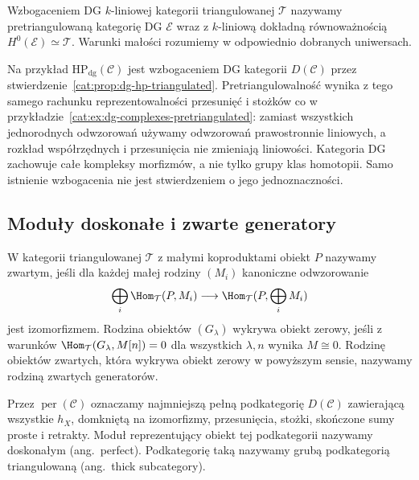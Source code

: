 \begin{definicja}\label{cat:def:dg-enhancement}
Wzbogaceniem DG $k$-liniowej kategorii triangulowanej $\mathcal T$ nazywamy pretriangulowaną kategorię DG $\mathcal E$ wraz z $k$-liniową dokładną równoważnością $H^0(\mathcal E)\simeq\mathcal T$. Warunki małości rozumiemy w odpowiednio dobranych uniwersach.
\end{definicja}

Na przykład $\mathrm{HP}_{\mathrm{dg}}(\mathcal C)$ jest wzbogaceniem DG kategorii $D(\mathcal C)$ przez stwierdzenie~\ref{cat:prop:dg-hp-triangulated}. Pretriangulowalność wynika z tego samego rachunku reprezentowalności przesunięć i stożków co w przykładzie~\ref{cat:ex:dg-complexes-pretriangulated}: zamiast wszystkich jednorodnych odwzorowań używamy odwzorowań prawostronnie liniowych, a rozkład współrzędnych i przesunięcia nie zmieniają liniowości. Kategoria DG zachowuje całe kompleksy morfizmów, a nie tylko grupy klas homotopii. Samo istnienie wzbogacenia nie jest stwierdzeniem o jego jednoznaczności.

\subsection{Moduły doskonałe i zwarte generatory}

\begin{definicja}\label{cat:def:dg-compact}
W kategorii triangulowanej $\mathcal T$ z małymi koproduktami obiekt $P$ nazywamy zwartym, jeśli dla każdej małej rodziny $(M_i)$ kanoniczne odwzorowanie
\[
 \bigoplus_i\Hom_{\mathcal T}(P,M_i)
 \longrightarrow \Hom_{\mathcal T}(P,\bigoplus_i M_i)
\]
jest izomorfizmem. Rodzina obiektów $(G_\lambda)$ wykrywa obiekt zerowy, jeśli z warunków
$\Hom_{\mathcal T}(G_\lambda,M[n])=0$ dla wszystkich $\lambda,n$ wynika $M\cong0$. Rodzinę obiektów zwartych, która wykrywa obiekt zerowy w powyższym sensie, nazywamy rodziną zwartych generatorów.
\end{definicja}

\begin{definicja}\label{cat:def:dg-perfect}
Przez $\operatorname{per}(\mathcal C)$ oznaczamy najmniejszą pełną podkategorię $D(\mathcal C)$ zawierającą wszystkie $h_X$, domkniętą na izomorfizmy, przesunięcia, stożki, skończone sumy proste i retrakty. Moduł reprezentujący obiekt tej podkategorii nazywamy doskonałym (ang.\ perfect). Podkategorię taką nazywamy grubą podkategorią triangulowaną (ang.\ thick subcategory).
\end{definicja}

